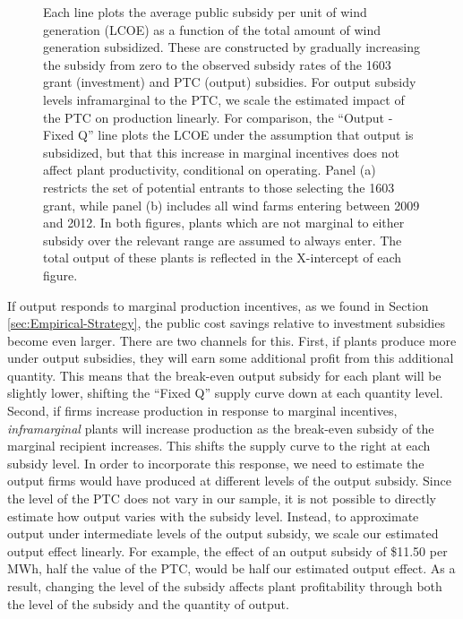 \documentclass[12pt]{article}
\begin{document}
\begin{figure}[htb]
  \footnotesize
  Each line plots the average public subsidy per unit of wind generation (LCOE) as a function of the total amount of wind generation subsidized. These are constructed by gradually increasing the subsidy from zero to the observed subsidy rates of the 1603 grant (investment) and PTC (output) subsidies. For output subsidy levels inframarginal to the PTC, we scale the estimated impact of the PTC on production linearly. For comparison, the ``Output - Fixed Q'' line plots the LCOE under the assumption that output is subsidized, but that this increase in marginal incentives does not affect plant productivity, conditional on operating. Panel (a) restricts the set of potential entrants to those selecting the 1603 grant, while panel (b) includes all wind farms entering between 2009 and 2012. In both figures, plants which are not marginal to either subsidy over the relevant range are assumed to always enter. The total output of these plants is reflected in the X-intercept of each figure. 
\end{figure}

If output responds to marginal production incentives, as we found in Section \ref{sec:Empirical-Strategy}, the public cost savings relative to investment subsidies become even larger. There are two channels for this. First, if plants produce more under output subsidies, they will earn some additional profit from this additional quantity. This means that the break-even output subsidy for each plant will be slightly lower, shifting the ``Fixed Q'' supply curve down at each quantity level. Second, if firms increase production in response to marginal incentives, \emph{inframarginal} plants will increase production as the break-even subsidy of the marginal recipient increases. This shifts the supply curve to the right at each subsidy level. In order to incorporate this response, we need to estimate the output firms would have produced at different levels of the output subsidy. Since the level of the PTC does not vary in our sample, it is not possible to directly estimate how output varies with the subsidy level. Instead, to approximate output under intermediate levels of the output subsidy, we scale our estimated output effect linearly. For example, the effect of an output subsidy of \$11.50 per MWh, half the value of the PTC, would be half our estimated output effect. As a result, changing the level of the subsidy affects plant profitability through both the level of the subsidy and the quantity of output.
 
\end{document}
